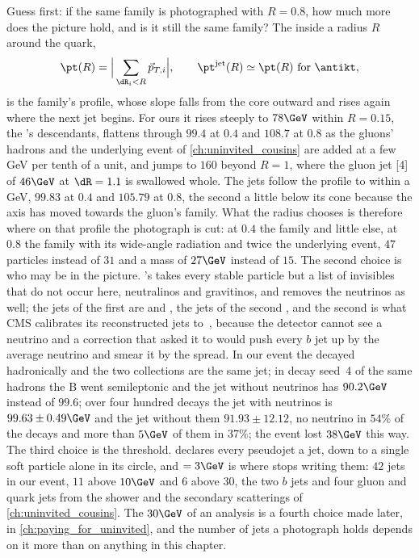 Guess first: if the same family is photographed with $R=0.8$, how much
more does the picture hold, and is it still the same family? The \pt
inside a radius $R$ around the quark,
\begin{equation}
  \pt(R)=\Big|\sum_{\dR_i<R}\vec p_{T,i}\Big|,\qquad
  \pt^{\mathrm{jet}}(R)\simeq\pt(R)\ \text{for \antikt},
  \label{eq:family_photograph:ptR}
\end{equation}
is the family's profile, whose slope falls from the core outward and
rises again where the next jet begins. For ours it rises steeply to $78\GeV$ within
$R=0.15$, the \Bbar's descendants, flattens through $99.4$ at $0.4$ and
$108.7$ at $0.8$ as the gluons' hadrons and the underlying event of
\cref{ch:uninvited_cousins} are added at a few GeV per tenth of a unit,
and jumps to $160$ beyond $R=1$, where the gluon jet [4] of $46\GeV$ at
$\dR=1.1$ is swallowed whole. The \antikt jets follow the profile to
within a GeV, $99.83$ at $0.4$ and $105.79$ at $0.8$, the second a little
below its cone because the \akeight axis has moved towards the gluon's
family. What the radius chooses is therefore where on that profile the
photograph is cut: at $0.4$ the family and little else, at $0.8$ the
family with its wide-angle radiation and twice the underlying event,
$47$ particles instead of $31$ and a mass of $27\GeV$ instead of $15$.
The second choice is who may be in the picture. \CMSSW's
 takes every stable particle but a list of
invisibles that do not occur here, neutralinos and gravitinos, and
 removes the neutrinos as well; the jets of
the first are \akfour and \akeight, the jets of the second \akfournonu,
and the second is what CMS calibrates its reconstructed jets
to~\cite{CMS:2016lmd}, because the detector cannot see a neutrino and a
correction that asked it to would push every $b$ jet up by the average
neutrino and smear it by the spread. In our event the \Bbar decayed
hadronically and the two \akfour collections are the same jet; in
decay seed~4 of the same hadrons the B went semileptonic and the jet
without neutrinos has $90.2\GeV$ instead of $99.6$; over four hundred
decays the jet with neutrinos is $99.63\pm0.49\GeV$ and the jet without
them $91.93\pm12.12$, no neutrino in $54\%$ of the decays and more than
$5\GeV$ of them in $37\%$; the \CMSSW event lost $38\GeV$ this way. The
third choice is the threshold. \antikt declares every pseudojet a jet,
down to a single soft particle alone in its circle, and
 $=3\GeV$ is where \CMSSW stops writing
them: $42$ \akfour jets in our event, $11$ above $10\GeV$ and $6$ above
$30$, the two $b$ jets and four gluon and quark jets from the shower and
the secondary scatterings of \cref{ch:uninvited_cousins}. The $30\GeV$
of an analysis is a fourth choice made later, in
\cref{ch:paying_for_uninvited}, and the number of jets a photograph holds
depends on it more than on anything in this chapter.

